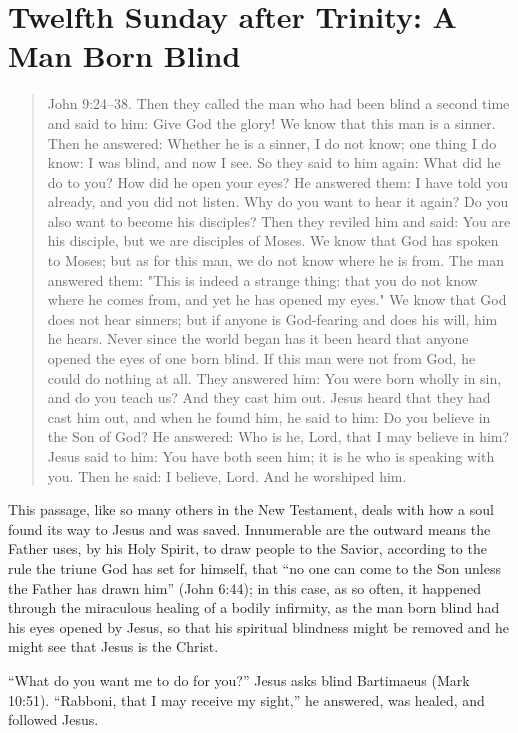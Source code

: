
\section{Twelfth Sunday after Trinity: A Man Born Blind}

\begin{quote}

John 9:24–38. Then they called the man who had been blind a second time and said to him: Give God the glory! We know that this man is a sinner. Then he answered: Whether he is a sinner, I do not know; one thing I do know: I was blind, and now I see. So they said to him again: What did he do to you? How did he open your eyes? He answered them: I have told you already, and you did not listen. Why do you want to hear it again? Do you also want to become his disciples? Then they reviled him and said: You are his disciple, but we are disciples of Moses. We know that God has spoken to Moses; but as for this man, we do not know where he is from. The man answered them: "This is indeed a strange thing: that you do not know where he comes from, and yet he has opened my eyes." We know that God does not hear sinners; but if anyone is God-fearing and does his will, him he hears. Never since the world began has it been heard that anyone opened the eyes of one born blind. If this man were not from God, he could do nothing at all. They answered him: You were born wholly in sin, and do you teach us? And they cast him out. Jesus heard that they had cast him out, and when he found him, he said to him: Do you believe in the Son of God? He answered: Who is he, Lord, that I may believe in him? Jesus said to him: You have both seen him; it is he who is speaking with you. Then he said: I believe, Lord. And he worshiped him.

\end{quote}

\bigskip

This passage, like so many others in the New Testament, deals with how a soul found its way to Jesus and was saved. Innumerable are the outward means the Father uses, by his Holy Spirit, to draw people to the Savior, according to the rule the triune God has set for himself, that “no one can come to the Son unless the Father has drawn him” (John 6:44); in this case, as so often, it happened through the miraculous healing of a bodily infirmity, as the man born blind had his eyes opened by Jesus, so that his spiritual blindness might be removed and he might see that Jesus is the Christ.

“What do you want me to do for you?” Jesus asks blind Bartimaeus (Mark 10:51). “Rabboni, that I may receive my sight,” he answered, was healed, and followed Jesus.

